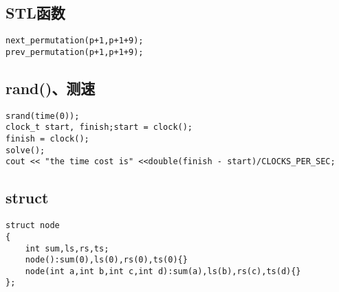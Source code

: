 \documentclass[12pt, a4paper, oneside]{ctexart}
\begin{document}
\subsection{STL函数 } 
\begin{lstlisting}
next_permutation(p+1,p+1+9);
prev_permutation(p+1,p+1+9);
\end{lstlisting}




\subsection{rand()、测速  } 
\begin{lstlisting}
srand(time(0));
clock_t start, finish;start = clock();
finish = clock();
solve();
cout << "the time cost is" <<double(finish - start)/CLOCKS_PER_SEC;
\end{lstlisting}



\subsection{struct} 
\begin{lstlisting}
struct node
{
	int sum,ls,rs,ts;
	node():sum(0),ls(0),rs(0),ts(0){}
	node(int a,int b,int c,int d):sum(a),ls(b),rs(c),ts(d){}
};
\end{lstlisting}
\end{document}
